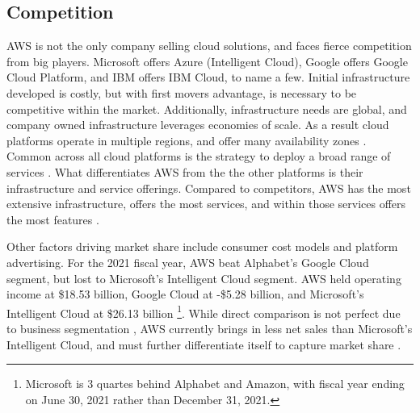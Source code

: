 \documentclass[a4paper, 12pt]{article}
\begin{document}
\subsection{Competition}
AWS is not the only company selling cloud solutions, and faces fierce competition from big players. 
Microsoft offers Azure (Intelligent Cloud), Google offers Google Cloud Platform, and IBM offers IBM Cloud, to name a few. 
Initial infrastructure developed is costly, but with first movers advantage, is necessary to be competitive within the market. 
Additionally, infrastructure needs are global, and company owned infrastructure leverages economies of scale. 
As a result cloud platforms operate in multiple regions, and offer many availability zones \cite{AMZN_AWS_GLOBAL_INFRA, GOOG_GCP_GLOBAL_INFRA, MSFT_AZURE_GLOBAL_INFRA}.
Common across all cloud platforms is the strategy to deploy a broad range of services \cite{AMZN_AWS_CLOUD_PRODUCTS, GOOG_GCP_CLOUD_PRODUCTS, MSFT_AZURE_CLOUD_PRODUCTS}. 
What differentiates AWS from the the other platforms is their infrastructure and service offerings. 
Compared to competitors, AWS has the most extensive infrastructure, offers the most services, and within those services offers the most features \cite{AMZN_AWS_CLOUD_COMPUTE}.

Other factors driving market share include consumer cost models and platform advertising. 
For the 2021 fiscal year, AWS beat Alphabet's Google Cloud segment, but lost to Microsoft's Intelligent Cloud segment. 
AWS held operating income at \$18.53 billion, Google Cloud at -\$5.28 billion, and Microsoft's Intelligent Cloud at \$26.13 billion \cite[p~.24, p.~38, p.~44]{AMZN_10K_2021, GOOG_10K_2021, MSFT_10K_2021} \footnote{Microsoft is 3 quartes behind Alphabet and Amazon, with fiscal year ending on June 30, 2021 rather than December 31, 2021.}.
While direct comparison is not perfect due to business segmentation \cite[p.~64, p.~41, p.~21]{AMZN_ANNUAL_2021, GOOG_ANNUAL_REPORT_2021, MSFT_ANNUAL_REPORT_2022}, AWS currently brings in less net sales than Microsoft's Intelligent Cloud, and must further differentiate itself to capture market share \cite[p.~65, p.~44]{AMZN_10K_2021, MSFT_10K_2021}. 

\end{document}
